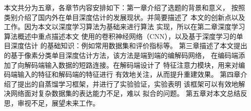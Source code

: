\label{sec:arrangement}
本文共分为五章，各章节内容安排如下：第一章介绍了选题的背景和意义，
按照类别介绍了国内外在单目深度估计的发展现状。并简要描述了
本文的创新点以及工作。因为本文以深度学习算法为基础来进行算法
实现，所以在第二章深度学习算法概述中重点描述本文
使用的卷积神经网络（CNN），以及基于深度学习的单目深度估计
的基础知识：例如常用数据集和评价指标等。
第三章描述了本文提出的基于像素分类单目深度估计方法，该方法是端到端的编解码网络，
在编码端添加了向解码端输入数据的短路连接。在解码端设计了
特征注意力模块，用来对编码端输入的特征和解码端的特征进行
有效地关注，从而提升重建效果。
第四章介绍了提出的自蒸馏学习框架，并进行了实验验证，实验表明
该框架可以有效地解决网络面对复杂数据集的表达能力不足，难以
拟合的问题。
第五章对本文总结反思，审视不足，展望未来工作。

